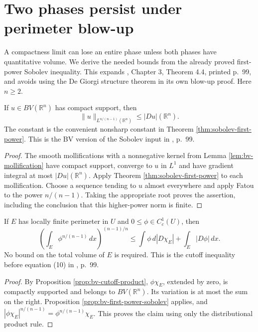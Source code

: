 \chapter{Two phases persist under perimeter blow-up}\label{sec:perimeter-two-phase}
A compactness limit can lose an entire phase unless both phases have quantitative volume. We derive the needed bounds from the already proved first-power Sobolev inequality. This expands \cite{Sim18}, Chapter 3, Theorem 4.4, printed p.~99, and avoids using the De Giorgi structure theorem in its own blow-up proof. Here $n\geq2$.

\begin{proposition}\label{prop:bv-first-power-sobolev}
If $u\in BV(\mathbb R^n)$ has compact support, then
\[
 \|u\|_{L^{n/(n-1)}(\mathbb R^n)}\leq |Du|(\mathbb R^n).
\]
The constant is the convenient nonsharp constant in Theorem \ref{thm:sobolev-first-power}. This is the BV version of the Sobolev input in \cite{Sim18}, p.~99.
\end{proposition}
\begin{proof}
The smooth mollifications with a nonnegative kernel from Lemma \ref{lem:bv-mollification} have compact support, converge to $u$ in $L^1$ and have gradient integral at most $|Du|(\mathbb R^n)$. Apply Theorem \ref{thm:sobolev-first-power} to each mollification. Choose a sequence tending to $u$ almost everywhere and apply Fatou to the power $n/(n-1)$. Taking the appropriate root proves the assertion, including the conclusion that this higher-power norm is finite.
\end{proof}

\begin{corollary}\label{cor:phase-cutoff-sobolev}
If $E$ has locally finite perimeter in $U$ and $0\leq\phi\in C_c^1(U)$, then
\[
 \left(\int_E\phi^{n/(n-1)}\,dx\right)^{(n-1)/n}
 \leq\int\phi\,d|D\chi_E|+\int_E|D\phi|\,dx.
\]
No bound on the total volume of $E$ is required. This is the cutoff inequality before equation (10) in \cite{Sim18}, p.~99.
\end{corollary}
\begin{proof}
By Proposition \ref{prop:bv-cutoff-product}, $\phi\chi_E$, extended by zero, is compactly supported and belongs to $BV(\mathbb R^n)$. Its variation is at most the sum on the right. Proposition \ref{prop:bv-first-power-sobolev} applies, and $|\phi\chi_E|^{n/(n-1)}=\phi^{n/(n-1)}\chi_E$. This proves the claim using only the distributional product rule.
\end{proof}

